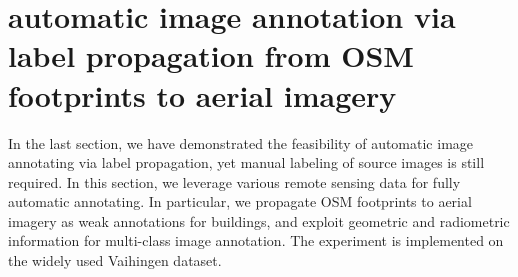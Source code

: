

          
\section{automatic image annotation via label propagation from OSM footprints to aerial imagery}
\label{sec:experiment2}
In the last section, we have demonstrated the feasibility of automatic image annotating via label propagation, yet manual labeling of source images is still required. In this section, we leverage various remote sensing data for fully automatic annotating. In particular, we propagate OSM footprints to aerial imagery as weak annotations for buildings, and exploit geometric and radiometric information for multi-class image annotation. The experiment is implemented on the widely used Vaihingen dataset.


